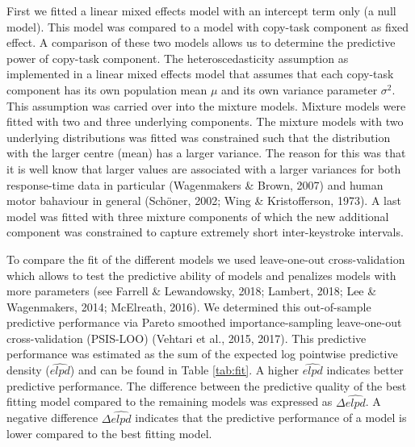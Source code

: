\documentclass[,man,floatsintext]{apa6}
\begin{document}
First we fitted a linear mixed effects model with an intercept term only (a null model). This model was compared to a model with copy-task component as fixed effect. A comparison of these two models allows us to determine the predictive power of copy-task component. The heteroscedasticity assumption as implemented in a linear mixed effects model that assumes that each copy-task component has its own population mean \(\mu\) and its own variance parameter \(\sigma^2\). This assumption was carried over into the mixture models. Mixture models were fitted with two and three underlying components. The mixture models with two underlying distributions was fitted was constrained such that the distribution with the larger centre (mean) has a larger variance. The reason for this was that it is well know that larger values are associated with a larger variances for both response-time data in particular (Wagenmakers \& Brown, 2007) and human motor bahaviour in general (Schöner, 2002; Wing \& Kristofferson, 1973). A last model was fitted with three mixture components of which the new additional component was constrained to capture extremely short inter-keystroke intervals.

To compare the fit of the different models we used leave-one-out cross-validation which allows to test the predictive ability of models and penalizes models with more parameters (see Farrell \& Lewandowsky, 2018; Lambert, 2018; Lee \& Wagenmakers, 2014; McElreath, 2016). We determined this out-of-sample predictive performance via Pareto smoothed importance-sampling leave-one-out cross-validation (PSIS-LOO) (Vehtari et al., 2015, 2017). This predictive performance was estimated as the sum of the expected log pointwise predictive density (\(\widehat{elpd}\)) and can be found in Table \ref{tab:fit}. A higher \(\widehat{elpd}\) indicates better predictive performance. The difference between the predictive quality of the best fitting model compared to the remaining models was expressed as \(\Delta\widehat{elpd}\). A negative difference \(\Delta\widehat{elpd}\) indicates that the predictive performance of a model is lower compared to the best fitting model.
\end{document}
